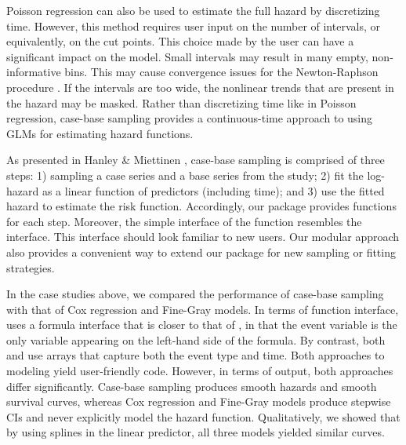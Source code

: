 Poisson regression can also be used to estimate the full hazard by
discretizing time. However, this method requires user input on the
number of intervals, or equivalently, on the cut points. This choice
made by the user can have a significant impact on the model. Small
intervals may result in many empty, non-informative bins. This may cause
convergence issues for the Newton-Raphson procedure
\citep{kalbfleisch2011statistical}. If the intervals are too wide, the
nonlinear trends that are present in the hazard may be masked. Rather
than discretizing time like in Poisson regression, case-base sampling
provides a continuous-time approach to using GLMs for estimating hazard
functions.

As presented in Hanley \& Miettinen \citeyearpar{hanley2009fitting},
case-base sampling is comprised of three steps: 1) sampling a case
series and a base series from the study; 2) fit the log-hazard as a
linear function of predictors (including time); and 3) use the fitted
hazard to estimate the risk function. Accordingly, our package provides
functions for each step. Moreover, the simple interface of the
 function resembles the  interface.
This interface should look familiar to new users. Our modular approach
also provides a convenient way to extend our package for new sampling or
fitting strategies.

In the case studies above, we compared the performance of case-base
sampling with that of Cox regression and Fine-Gray models. In terms of
function interface,  uses a formula interface that is
closer to that of , in that the event variable is the only
variable appearing on the left-hand side of the formula. By contrast,
both  and  use arrays
that capture both the event type and time. Both approaches to modeling
yield user-friendly code. However, in terms of output, both approaches
differ significantly. Case-base sampling produces smooth hazards and
smooth survival curves, whereas Cox regression and Fine-Gray models
produce stepwise CIs and never explicitly model the hazard function.
Qualitatively, we showed that by using splines in the linear predictor,
all three models yielded similar curves.

